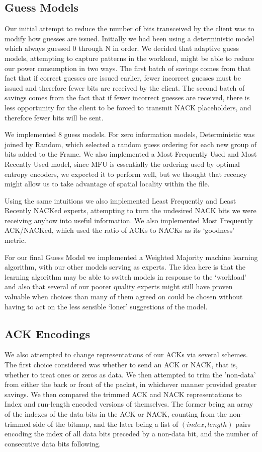 \documentclass[conference]{IEEEtran}
\begin{document}
\subsection{Guess Models}
Our initial attempt to reduce the number of bits transceived by the
client was to modify how guesses are issued.  Initially we had been
using a deterministic model which always guessed 0 through N in order.
We decided that adaptive guess models, attempting to capture patterns
in the workload, might be able to reduce our power consumption in two
ways.  The first batch of savings comes from that fact that if correct
guesses are issued earlier, fewer incorrect guesses must be issued and
therefore fewer bits are received by the client.  The second batch of
savings comes from the fact that if fewer incorrect guesses are
received, there is less opportunity for the client to be forced to
transmit NACK placeholders, and therefore fewer bits will be sent.

We implemented 8 guess models.  For zero information models,
Deterministic was joined by Random, which selected a random guess
ordering for each new group of bits added to the Frame.  We also
implemented a Most Frequently Used and Most Recently Used model, since
MFU is essentially the ordering used by optimal entropy encoders, we
expected it to perform well, but we thought that recency might allow
us to take advantage of spatial locality within the file.

Using the same intuitions we also implemented Least Frequently and
Least Recently NACKed experts, attempting to turn the undesired NACK
bits we were receiving anyhow into useful information.  We also
implemented Most Frequently ACK/NACKed, which used the ratio of ACKs
to NACKs as its `goodness' metric.

For our final Guess Model we implemented a Weighted Majority machine
learning algorithm, with our other models serving as experts.  The
idea here is that the learning algorithm may be able to switch models
in response to the `workload' and also that several of our poorer quality
experts might still have proven valuable when choices than many of
them agreed on could be chosen without having to act on the less
sensible `loner' suggestions of the model.


\subsection{ACK Encodings}

We also attempted to change representations of our ACKs via several
schemes.  The first choice considered was whether to send an ACK or
NACK, that is, whether to treat ones or zeros as data.  We then
attempted to trim the 'non-data' from either the back or front of the
packet, in whichever manner provided greater savings.  We then
compared the trimmed ACK and NACK representations to Index and
run-length encoded versions of themselves.  The former being an array
of the indexes of the data bits in the ACK or NACK, counting from the
non-trimmed side of the bitmap, and the later being a list of $(index,
length)$ pairs encoding the index of all data bits preceded by a
non-data bit, and the number of consecutive data bits following. 
\end{document}
